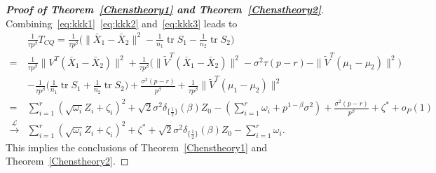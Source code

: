 \documentclass[review]{elsarticle}
\DeclareMathOperator{\mytr}{tr}
\theoremstyle{plain}
\theoremstyle{definition}
\theoremstyle{remark}
\begin{document}
\begin{proof}[\textbf{Proof of Theorem~\ref{Chenstheory1} and Theorem~\ref{Chenstheory2}}]
    Combining~\eqref{eq:kkk1}~\eqref{eq:kkk2} and~\eqref{eq:kkk3} leads to
    $$
    \begin{aligned}
        &\frac{1}{\tau p^{\beta}} T_{CQ}
        =\frac{1}{\tau p^{\beta}}\big(\|\bar{X}_1-\bar{X}_2\|^2-\frac{1}{n_1}\mytr S_1-\frac{1}{n_2}\mytr S_2\big)\\
        =&
        \frac{1}{\tau p^{\beta}}{\|V^T(\bar{X}_1-\bar{X}_2)\|^2}+
        \frac{1}{\tau p^{\beta}} \big({\|\tilde{V}^T(\bar{X}_1-\bar{X}_2)\|^2-\sigma^2 \tau(p-r)-\|\tilde{V}^T(\mu_1-\mu_2)\|^2}\big)\\
        &-\frac{1}{\tau p^{\beta}}\Big(\frac{1}{n_1}\mytr S_1+\frac{1}{n_2}\mytr S_2\Big)+\frac{\sigma^2 (p-r)}{p^\beta}+\frac{1}{\tau p^\beta}\|\tilde{V}^T(\mu_1-\mu_2)\|^2\\
        =&
        \sum_{i=1}^r (\sqrt{\omega_i} Z_i+\zeta_i)^2+
   \sqrt{2} \sigma^2 \delta_{\{\frac{1}{2}\}}(\beta)Z_0
        -
        (\sum_{i=1}^r \omega_i+p^{1-\beta}\sigma^2)
        +\frac{\sigma^2 (p-r)}{p^\beta}+\zeta^*+o_P(1)\\
        \xrightarrow{\mathcal{L}}&
        \sum_{i=1}^r (\sqrt{\omega_i} Z_i+\zeta_i)^2+
\zeta^*+
    \sqrt{2}\sigma^2 \delta_{\{\frac{1}{2}\}}(\beta)Z_0
        -
        \sum_{i=1}^r \omega_i.
    \end{aligned}
    $$
    This implies the conclusions of Theorem~\ref{Chenstheory1} and Theorem~\ref{Chenstheory2}.

%

\end{proof}
\end{document}
